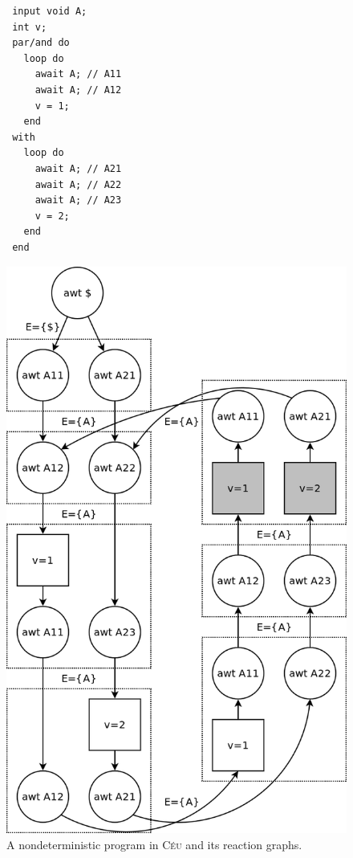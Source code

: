 \documentclass[preprint]{sigplanconf}
\newcommand{\CEU}{\textsc{C\'{e}u}\xspace}
\newcommand{\1}{\;}
\newcommand{\2}{\;\;}
\newcommand{\3}{\;\;\;}
\newcommand{\5}{\;\;\;\;\;}
\begin{document}
\begin{figure}[t]
\begin{minipage}[c]{0.40\linewidth}
{\small
\begin{verbatim}
 input void A;
 int v;
 par/and do
   loop do
     await A; // A11
     await A; // A12
     v = 1;
   end
 with
   loop do
     await A; // A21
     await A; // A22
     await A; // A23
     v = 2;
   end
 end
\end{verbatim}
}
\end{minipage}
%
\hspace{0.0cm}
%
\begin{minipage}[c]{0.60\linewidth}
\centering
\includegraphics[width=\textwidth]{dfa.png}
\end{minipage}
\caption{ A nondeterministic program in \CEU and its reaction graphs.
\label{fig:det}
}
\end{figure}
\end{document}
